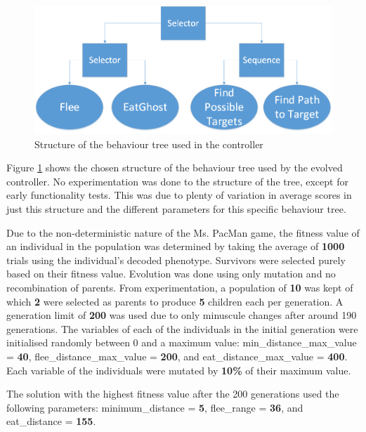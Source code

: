 \begin{figure}[htp]
\centerline{\includegraphics[width=1\columnwidth]{BehaviourTree}}
\caption{Structure of the behaviour tree used in the controller}
\label{figure-BT}
\end{figure}

Figure \ref{figure-BT} shows the chosen structure of the behaviour tree used by the evolved controller. No experimentation was done to the structure of the tree, except for early functionality tests. This was due to plenty of variation in average scores in just this structure and the different parameters for this specific behaviour tree.

Due to the non-deterministic nature of the Ms. PacMan game, the fitness value of an individual in the population was determined by taking the average of \textbf{1000} trials using the individual's decoded phenotype. Survivors were selected purely based on their fitness value. Evolution was done using only mutation and no recombination of parents. From experimentation, a population of \textbf{10} was kept of which \textbf{2} were selected as parents to produce \textbf{5} children each per generation. A generation limit of \textbf{200} was used due to only minuscule changes after around 190 generations. The variables of each of the individuals in the initial generation were initialised randomly between 0 and a maximum value: min\_distance\_max\_value = \textbf{40}, flee\_distance\_max\_value = \textbf{200}, and eat\_distance\_max\_value = \textbf{400}. Each variable of the individuals were mutated by \textbf{10\%} of their maximum value.

The solution with the highest fitness value after the 200 generations used the following parameters: minimum\_distance = \textbf{5}, flee\_range = \textbf{36}, and eat\_distance = \textbf{155}.